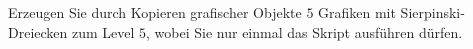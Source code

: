 \begin{aufg}[0]
Erzeugen Sie durch Kopieren grafischer Objekte $5$ Grafiken mit
Sierpinski-Dreiecken zum Level $5$, wobei Sie nur einmal das Skript
 ausf\"uhren d\"urfen.
\end{aufg}